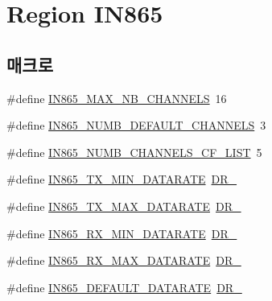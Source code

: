 \hypertarget{group___r_e_g_i_o_n_i_n865}{}\section{Region I\+N865}
\label{group___r_e_g_i_o_n_i_n865}
\subsection*{매크로}
\begin{DoxyCompactItemize}
\item 
\#define \mbox{\hyperlink{group___r_e_g_i_o_n_i_n865_ga6fbcf463cb8df05984d576d96383651d}{I\+N865\+\_\+\+M\+A\+X\+\_\+\+N\+B\+\_\+\+C\+H\+A\+N\+N\+E\+LS}}~16
\item 
\#define \mbox{\hyperlink{group___r_e_g_i_o_n_i_n865_ga166b325d6a142fe02d403487b708fcbb}{I\+N865\+\_\+\+N\+U\+M\+B\+\_\+\+D\+E\+F\+A\+U\+L\+T\+\_\+\+C\+H\+A\+N\+N\+E\+LS}}~3
\item 
\#define \mbox{\hyperlink{group___r_e_g_i_o_n_i_n865_gacf065f42ef7f7e9c2815559116faf20a}{I\+N865\+\_\+\+N\+U\+M\+B\+\_\+\+C\+H\+A\+N\+N\+E\+L\+S\+\_\+\+C\+F\+\_\+\+L\+I\+ST}}~5
\item 
\#define \mbox{\hyperlink{group___r_e_g_i_o_n_i_n865_ga334bf7f8b226ad91762f977490af0c72}{I\+N865\+\_\+\+T\+X\+\_\+\+M\+I\+N\+\_\+\+D\+A\+T\+A\+R\+A\+TE}}~\mbox{\hyperlink{group___r_e_g_i_o_n_ga6c4ef966b4f3d5eb7597b087f2b97095}{D\+R\+\_}}
\item 
\#define \mbox{\hyperlink{group___r_e_g_i_o_n_i_n865_ga927945116c9bf6917614b894d45c0972}{I\+N865\+\_\+\+T\+X\+\_\+\+M\+A\+X\+\_\+\+D\+A\+T\+A\+R\+A\+TE}}~\mbox{\hyperlink{group___r_e_g_i_o_n_ga3a06805baf4f00911a3a5d3dbadebf61}{D\+R\+\_}}
\item 
\#define \mbox{\hyperlink{group___r_e_g_i_o_n_i_n865_ga59fe5dabb4cddd00deb343648d18e8cc}{I\+N865\+\_\+\+R\+X\+\_\+\+M\+I\+N\+\_\+\+D\+A\+T\+A\+R\+A\+TE}}~\mbox{\hyperlink{group___r_e_g_i_o_n_ga6c4ef966b4f3d5eb7597b087f2b97095}{D\+R\+\_}}
\item 
\#define \mbox{\hyperlink{group___r_e_g_i_o_n_i_n865_gac1653eb95c60570e630c485302a8c2af}{I\+N865\+\_\+\+R\+X\+\_\+\+M\+A\+X\+\_\+\+D\+A\+T\+A\+R\+A\+TE}}~\mbox{\hyperlink{group___r_e_g_i_o_n_ga3a06805baf4f00911a3a5d3dbadebf61}{D\+R\+\_}}
\item 
\#define \mbox{\hyperlink{group___r_e_g_i_o_n_i_n865_ga2bf71935d5975ceb0e8e9b1e810e52f9}{I\+N865\+\_\+\+D\+E\+F\+A\+U\+L\+T\+\_\+\+D\+A\+T\+A\+R\+A\+TE}}~\mbox{\hyperlink{group___r_e_g_i_o_n_ga6c4ef966b4f3d5eb7597b087f2b97095}{D\+R\+\_}}

\end{DoxyCompactItemize}
